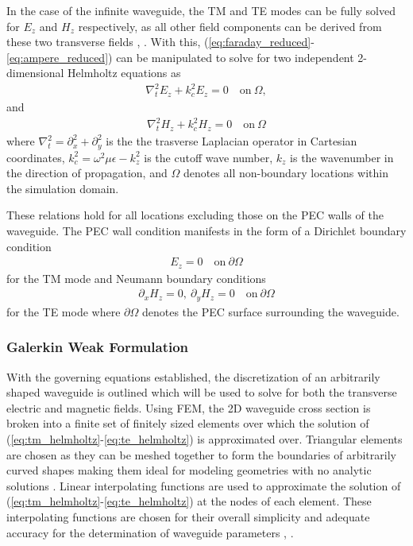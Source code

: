In the case of the infinite waveguide, the TM and TE modes can be fully solved for $E_z$ and $H_z$ respectively, as all other field components can be derived from these two transverse fields \cite{rothlecnotes}, \cite{jin2011theory}. With this, (\ref{eq:faraday_reduced}-\ref{eq:ampere_reduced}) can be manipulated to solve for two independent 2-dimensional Helmholtz equations as
\begin{align}
	\nabla_t^2 E_z+k_c^2E_z=0 \quad \mathrm{on} \ \Omega,
	\label{eq:tm_helmholtz}
\end{align}
and
\begin{align}
	\nabla_t^2 H_z+k_c^2H_z=0 \quad \mathrm{on} \ \Omega
	\label{eq:te_helmholtz}
\end{align}
where $\nabla_t^2=\partial^2_x+\partial^2_y$ is the the trasverse Laplacian operator in Cartesian coordinates, $k_c^2=\omega^2\mu\epsilon-k_z^2$ is the cutoff wave number, $k_z$ is the wavenumber in the direction of propagation, and $\Omega$ denotes all non-boundary locations within the simulation domain.

These relations hold for all locations excluding those on the PEC walls of the waveguide. The PEC wall condition manifests in the form of a Dirichlet boundary condition
\begin{align}
	E_z=0 \quad \mathrm{on} \ \partial\Omega
	\label{eq:diriclet_tm}
\end{align}
for the TM mode and Neumann boundary conditions
\begin{align}
	\partial_x H_z = 0,\ \partial_y H_z = 0 \quad \mathrm{on} \ \partial\Omega
	\label{eq:neumann_te}
\end{align}
for the TE mode where $\partial\Omega$ denotes the PEC surface surrounding the waveguide.

\subsubsection{Galerkin Weak Formulation}
\label{subsub:galerkin_weak}
With the governing equations established, the discretization of an arbitrarily shaped waveguide is outlined which will be used to solve for both the transverse electric and magnetic fields. Using FEM, the 2D waveguide cross section is broken into a finite set of finitely sized elements over which the solution of (\ref{eq:tm_helmholtz}-\ref{eq:te_helmholtz}) is approximated over. Triangular elements are chosen as they can be meshed together to form the boundaries of arbitrarily curved shapes making them ideal for modeling geometries with no analytic solutions \cite{jin2011theory}. Linear interpolating functions are used to approximate the solution of (\ref{eq:tm_helmholtz}-\ref{eq:te_helmholtz}) at the nodes of each element. These interpolating functions are chosen for their overall simplicity and adequate accuracy for the determination of waveguide parameters \cite{rothlecnotes}, \cite{jin2011theory}. 

